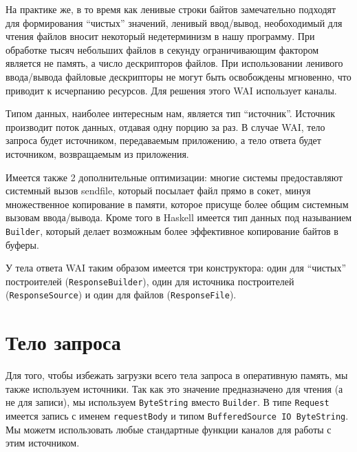 На практике же, в то время как ленивые строки байтов замечательно подходят для формирования
``чистых'' значений, ленивый ввод/вывод, необоходимый для чтения файлов вносит некоторый
недетерминизм в нашу программу. При обработке тысяч небольших файлов в секунду ограничивающим
фактором является не память, а число дескрипторов файлов. При использовании ленивого
ввода/вывода файловые дескрипторы не могут быть освобождены мгновенно, что приводит к
исчерпанию ресурсов. Для решения этого WAI использует каналы.


Типом данных, наиболее интересным нам, является тип ``источник''. Источник производит
поток данных, отдавая одну порцию за раз. В случае WAI, тело запроса будет источником,
передаваемым приложению, а тело ответа будет источником, возвращаемым из приложения.

Имеется также 2 дополнительные оптимизации: многие системы предоставляют системный вызов sendfile, который
посылает файл прямо в сокет, минуя множественное копирование в памяти, которое присуще
более общим системным вызовам ввода/вывода. Кроме того в Haskell имеется тип данных
под называнием \lstinline!Builder!, который делает возможным более эффективное копирование
байтов в буферы.

У тела ответа WAI таким образом имеется три конструктора: один для ``чистых'' построителей
(\lstinline!ResponseBuilder!), один для источника построителей (\lstinline!ResponseSource!) и
один для файлов (\lstinline!ResponseFile!).

\section {Тело запроса}

Для того, чтобы избежать загрузки всего тела запроса в оперативную память, мы также используем
источники. Так как это значение предназначено для чтения (а не для записи), мы используем
\lstinline!ByteString! вместо \lstinline!Builder!. В типе \lstinline!Request! имеется
запись с именем \lstinline!requestBody! и типом \lstinline!BufferedSource IO ByteString!.
Мы можетм использовать любые стандартные функции каналов для работы с этим источником.

